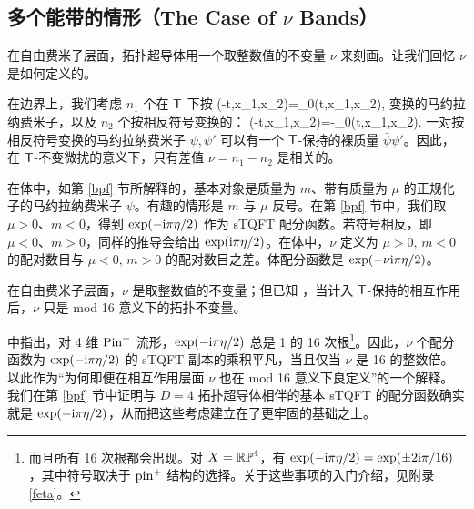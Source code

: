 
\subsection{多个能带的情形（The Case of $\nu$ Bands）}\label{bands}

在自由费米子层面，拓扑超导体用一个取整数值的不变量 $\nu$ 来刻画。让我们回忆 $\nu$ 是如何定义的。

在边界上，我们考虑 $n_1$ 个在 ${\sf T}$ 下按
\be\label{trt}\sT\psi(-t,x_1,x_2)=\g_0\psi(t,x_1,x_2),\ee
变换的马约拉纳费米子，以及 $n_2$ 个按相反符号变换的：
\be\label{utrt}\sT\psi(-t,x_1,x_2)=-\g_0\psi(t,x_1,x_2).\ee
一对按相反符号变换的马约拉纳费米子 $\psi,\psi'$ 可以有一个 ${\sf T}$-保持的裸质量 $\bar\psi\psi'$。因此，在 ${\sf T}$-不变微扰的意义下，只有差值 $\nu=n_1-n_2$ 是相关的。


在体中，如第 \ref{bpf} 节所解释的，基本对象是质量为 $m$、带有质量为 $\mu$ 的正规化子的马约拉纳费米子 $\psi$。有趣的情形是 $m$ 与 $\mu$ 反号。在第 \ref{bpf} 节中，我们取 $\mu>0$、$m<0$，得到 $\exp(-{\mathrm i}\pi\eta/2)$ 作为 sTQFT 配分函数。若符号相反，即 $\mu<0$、$m>0$，同样的推导会给出 $\exp({\mathrm i}\pi\eta/2)$。在体中，$\nu$ 定义为 $\mu>0,\,m<0$ 的配对数目与 $\mu<0,\,m>0$ 的配对数目之差。体配分函数是 $\exp(-\nu{\mathrm i}\pi\eta/2)$。

在自由费米子层面，$\nu$ 是取整数值的不变量；但已知 \cite{KitTwo}，当计入 ${\sf T}$-保持的相互作用后，$\nu$ 只是 mod 16 意义下的拓扑不变量。

\cite{KTTW} 中指出，对 4 维 ${\mathrm{Pin}}^+$ 流形，$\exp(-{\mathrm i}\pi\eta/2)$ 总是 \cite{G,Stolz} 1 的 16 次根\footnote{而且所有 16 次根都会出现。对 $X={\mathbb{RP}}^4$，有 $\exp(-{\mathrm i}\pi \eta/2)=\exp(\pm 2{\mathrm i}\pi /16)$，其中符号取决于 ${\mathrm{pin}}^+$ 结构的选择。关于这些事项的入门介绍，见附录 \ref{feta}。}。因此，$\nu$ 个配分函数为 $\exp(-{\mathrm i}\pi\eta/2)$ 的 sTQFT 副本的乘积平凡，当且仅当 $\nu$ 是 16 的整数倍。\cite{KTTW} 以此作为“为何即便在相互作用层面 $\nu$ 也在 mod 16 意义下良定义”的一个解释。我们在第 \ref{bpf} 节中证明与 $D=4$ 拓扑超导体相伴的基本 sTQFT 的配分函数确实就是 $\exp(-{\mathrm i}\pi \eta/2)$，从而把这些考虑建立在了更牢固的基础之上。

